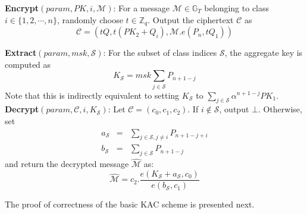  \noindent \textbf{Encrypt}$(param,PK,i,\mathcal{M})$: For a message $\mathcal{M} \in \mathbb{G}_T$ belonging to class $i \in \{1,2,\cdots,n\}$, randomly choose $t\in\mathbb{Z}_q$. Output the ciphertext $\mathcal{C}$ as 
 \begin{equation}
 \mathcal{C}=(tQ,t(PK_2+Q_i),\mathcal{M}.{e}(P_n,tQ_1)) \nonumber
 \end{equation}
 
 \noindent \textbf{Extract}$(param,msk,\mathcal{S})$: For the subset of class indices $\mathcal{S}$, the aggregate key is computed as 
 \begin{equation}
 K_{\mathcal{S}} = {msk}\sum_{j\in\mathcal{S}}P_{n+1-j} \nonumber
 \end{equation} 
 \noindent Note that this is indirectly equivalent to setting $K_{\mathcal{S}}$ to $\sum_{j\in\mathcal{S}}\alpha^{n+1-j}PK_1$.\\
 
 \noindent \textbf{Decrypt}$(param,\mathcal{C},i,K_{\mathcal{S}})$: Let $\mathcal{C}=(c_0,c_1,c_2)$. If $i\notin\mathcal{S}$, output $\bot$. Otherwise, set 
 \begin{eqnarray} 
 a_{\mathcal{S}}&=&\sum_{j\in\mathcal{S},j\neq i}P_{n+1-j+i} \nonumber \\
 b_{\mathcal{S}}&=&\sum_{j\in\mathcal{S}}P_{n+1-j} \nonumber 
 \end{eqnarray} 
 \noindent and return the decrypted message $\hat{\mathcal{M}}$ as: 
 \begin{equation}
  \hat{\mathcal{M}}=c_2.\frac{{e}(K_{\mathcal{S}}+a_{\mathcal{S}},c_0)}{{e}(b_{\mathcal{S}},c_1)} \nonumber
 \end{equation}


\noindent The proof of correctness of the basic KAC scheme is presented next.

